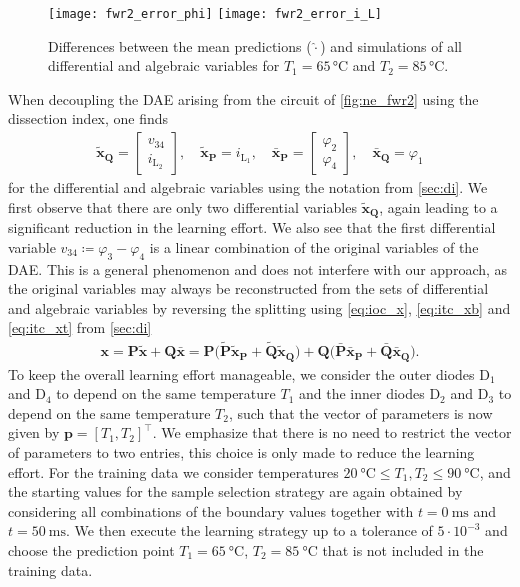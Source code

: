 \documentclass[AMA,STIX1COL]{WileyNJD-v2}
\newcommand{\mb}[1]{\mathbf{#1}}
\newcommand{\mbt}[1]{\tilde{\mathbf{#1}}}
\newcommand{\mbb}[1]{\bar{\mathbf{#1}}}
\newcommand{\mr}[1]{\mathrm{#1}}
\newcommand{\T}{{\!\top}}
\begin{document}
\begin{figure}[b]
    \begin{center}
        \texttt{[image: fwr2\_error\_phi]} \hspace{1.5cm} \texttt{[image: fwr2\_error\_i\_L]}
    \end{center}
    \caption{Differences between the mean predictions ($\hat{\cdot}$) and simulations of all differential and algebraic variables for $T_1 = 65\, \si{\celsius}$ and $T_2 = 85\, \si{\celsius}$.}
    \label{fig:ne_fwr2_error}
\end{figure}
When decoupling the DAE arising from the circuit of \autoref{fig:ne_fwr2} using the dissection index, one finds
\begin{align*}
    \mbt{x}_\mb{Q} = \begin{bmatrix}
        v_{34}\\
        i_{\mr{L}_2}
    \end{bmatrix}, \quad \mbt{x}_\mb{P} = i_{\mr{L}_1}, \quad \mbb{x}_\mb{P} = \begin{bmatrix}
        \varphi_2\\
        \varphi_4
    \end{bmatrix}, \quad \mbb{x}_\mb{Q} = \varphi_1
\end{align*}
for the differential and algebraic variables using the notation from \autoref{sec:di}. We first observe that there are only two differential variables $\mbt{x}_\mb{Q}$, again leading to a significant reduction in the learning effort. We also see that the first differential variable $v_{34} \coloneqq \varphi_3 - \varphi_4$ is a linear combination of the original variables of the DAE. This is a general phenomenon and does not interfere with our approach, as the original variables may always be reconstructed from the sets of differential and algebraic variables by reversing the splitting using \eqref{eq:ioc_x}, \eqref{eq:itc_xb} and \eqref{eq:itc_xt} from \autoref{sec:di}
\begin{align*}
    \mb{x} = \mb{P} \mbt{x} + \mb{Q} \mbb{x} = \mb{P} \big( \mbt{P} \mbt{x}_\mb{P} + \mbt{Q} \mbt{x}_\mb{Q} \big) + \mb{Q} \big( \mbb{P} \mbb{x}_\mb{P} + \mbb{Q} \mbb{x}_\mb{Q} \big).
\end{align*}
To keep the overall learning effort manageable, we consider the outer diodes $\mr{D}_1$ and $\mr{D}_4$ to depend on the same temperature $T_1$ and the inner diodes $\mr{D}_2$ and $\mr{D}_3$ to depend on the same temperature $T_2$, such that the vector of parameters is now given by $\mb{p} = [T_1, T_2]^\T$. We emphasize that there is no need to restrict the vector of parameters to two entries, this choice is only made to reduce the learning effort. For the training data we consider temperatures $\SI{20}{\celsius} \leq T_1, T_2 \leq \SI{90}{\celsius}$, and the starting values for the sample selection strategy are again obtained by considering all combinations of the boundary values together with $t = \SI{0}{\ms}$ and $t = \SI{50}{\ms}$. We then execute the learning strategy up to a tolerance of $5 \cdot 10^{-3}$ and choose the prediction point $T_1 = \SI{65}{\celsius}$, $T_2 = \SI{85}{\celsius}$ that is not included in the training data.
\end{document}
